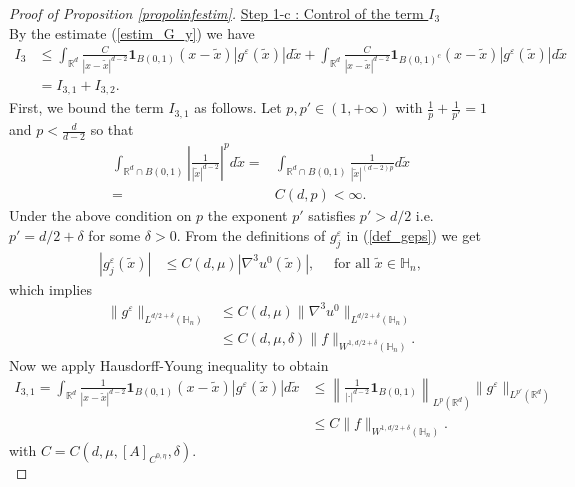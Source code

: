 \documentclass[11pt, reqno]{amsart}
\theoremstyle{definition}
\theoremstyle{remark}
\numberwithin{equation}{section}
\begin{document}
\begin{proof}[Proof of Proposition \textup{\ref{propolinfestim}}]
		\noindent \underline{Step 1-c :	Control of the term $I_3$}\\
		By the estimate (\ref{estim_G_y}) we have
		\begin{align*}
			I_3&\leq 	\int_{\mathbb{R}^d} \frac{C}{|x- \tilde{x}|^{d-2}}  \mathbf{1}_{B(0,1)} (x-\tilde{x}) |g^\varepsilon(\tilde{x})| d\tilde{x}	+ 	\int_{\mathbb{R}^d} \frac{C}{|x- \tilde{x}|^{d-2}}  \mathbf{1}_{B(0,1)^c} (x-\tilde{x})   |g^\varepsilon(\tilde{x})| d\tilde{x}\\
			&=	I_{3,1}+ I_{3,2}.
		\end{align*}
	First, we  bound the term $I_{3,1}$ as follows. Let  $p,p'\in(1,+\infty)$ with $\frac{1}{p}+\frac{1}{p'}=1$ and $p<\frac{d}{d-2}$ so that
		\begin{align*}
			\int_{\mathbb{R}^d\cap B(0,1)}    \left| \frac{1}{|\tilde{x}|^{d-2}} \right|^{p}  d\tilde{x}=& 	\int_{\mathbb{R}^d\cap B(0,1) }    \frac{1}{|\tilde{x}|^{(d-2)p}}  d\tilde{x} \\
			=& C(d,p)<\infty.	\end{align*} 
		Under the above condition on $p$ the exponent $p'$     satisfies $p'>d/2$   i.e. $p'=d/2+\delta$ for some $\delta>0$. From the definitions of $g^\varepsilon_j$ in (\ref{def_geps}) we get 
		\begin{align*}
			|g^\varepsilon_j(\tilde{x})|&\leq C (d,\mu)|\nabla^3 u^0(\tilde{x})|, \quad \mbox{ for all } \tilde{x}\in \mathbb{H}_n,
		\end{align*}
		which implies
		\begin{align}
			\|g^\varepsilon \|_{L^{d/2+\delta}(\mathbb{H}_n)}&\leq C (d,\mu) \|\nabla^3 u^0\|_{L^{d/2+\delta}(\mathbb{H}_n)}\nonumber\\
			&\leq C (d, \mu, \delta) \|f\|_{W^{1,d/2+\delta}(\mathbb{H}_n)}.\label{g_ineq_f}
		\end{align}
		Now we apply Hausdorff-Young inequality to obtain
		\begin{align}
			I_{3,1}=\int_{\mathbb{R}^d} \frac{1}{|x- \tilde{x}|^{d-2}} \mathbf{1}_{B(0,1)}(x-\tilde{x}) |g^\varepsilon(\tilde{x})| d\tilde{x} & \leq \left\| \frac{1}{|\cdot |^{d-2}} \mathbf{1}_{B(0,1)} \right\|_{L^p(\mathbb{R}^d)} \!\!\! \|g^\varepsilon\|_{L^{p'}(\mathbb{R}^d)}\nonumber	\\
			&\leq  C  \|f\|_{W^{1,d/2+\delta}(\mathbb{H}_n)}.\label{L1}
		\end{align}
		with $C=C(d,\mu,[A]_{C^{0,\eta}},\delta)$.\\
		

\end{proof}
\end{document}

